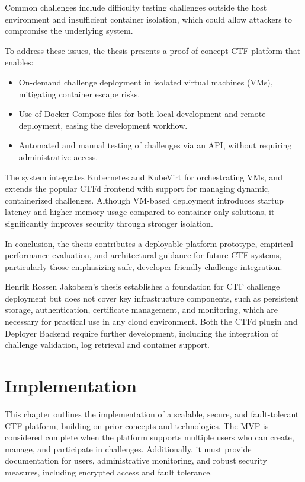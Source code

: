 Common challenges include difficulty testing challenges outside the host environment and insufficient container isolation, which could allow attackers to compromise the underlying system.

To address these issues, the thesis presents a proof-of-concept CTF platform that enables:

\begin{itemize}
    \item On-demand challenge deployment in isolated virtual machines (VMs), mitigating container escape risks.
    \item Use of Docker Compose files for both local development and remote deployment, easing the development workflow.
    \item Automated and manual testing of challenges via an API, without requiring administrative access.
\end{itemize}

The system integrates Kubernetes and KubeVirt for orchestrating VMs, and extends the popular CTFd frontend with support for managing dynamic, containerized challenges. Although VM-based deployment introduces startup latency and higher memory usage compared to container-only solutions, it significantly improves security through stronger isolation.

In conclusion, the thesis contributes a deployable platform prototype, empirical performance evaluation, and architectural guidance for future CTF systems, particularly those emphasizing safe, developer-friendly challenge integration.

Henrik Rossen Jakobsen's thesis establishes a foundation for CTF challenge deployment but does not cover key infrastructure components, such as persistent storage, authentication, certificate management, and monitoring, which are necessary for practical use in any cloud environment. Both the CTFd plugin and Deployer Backend require further development, including the integration of challenge validation, log retrieval and container support.

\chapter{Implementation}\label{chap:implementation}
This chapter outlines the implementation of a scalable, secure, and fault-tolerant CTF platform, building on prior concepts and technologies. The MVP is considered complete when the platform supports multiple users who can create, manage, and participate in challenges. Additionally, it must provide documentation for users, administrative monitoring, and robust security measures, including encrypted access and fault tolerance.

